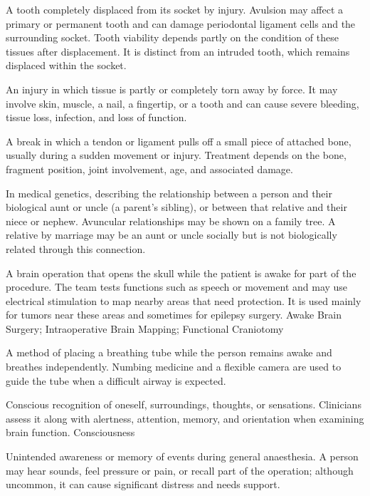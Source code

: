  A tooth completely displaced from its socket by injury. Avulsion
may affect a primary or permanent tooth and can damage periodontal ligament cells and the
surrounding socket. Tooth viability depends partly on the condition of these tissues after
displacement. It is distinct from an intruded tooth, which remains displaced within the socket.

 An injury in which tissue is partly or completely torn away by force. It may involve skin, muscle, a nail, a fingertip, or a tooth and can cause severe bleeding, tissue loss, infection, and loss of function.

 A break in which a tendon or ligament pulls off a small piece of attached bone, usually during a sudden movement or injury. Treatment depends on the bone, fragment position, joint involvement, age, and associated damage.

 In medical genetics, describing the relationship between a person and their
biological aunt or uncle (a parent's sibling), or between that relative and their niece or nephew.
Avuncular relationships may be shown on a family tree. A relative by marriage may be an aunt or
uncle socially but is not biologically related through this connection.

 A brain operation that opens the skull while the patient is awake for part
of the procedure. The team tests functions such as speech or movement and may use electrical
stimulation to map nearby areas that need protection. It is used mainly for tumors near these areas
and sometimes for epilepsy surgery.
\synonyms
Awake Brain Surgery; Intraoperative Brain Mapping; Functional Craniotomy

 A method of placing a breathing tube while the person remains awake and breathes independently. Numbing medicine and a flexible camera are used to guide the tube when a difficult airway is expected.

 Conscious recognition of oneself, surroundings, thoughts, or sensations. Clinicians assess it along with alertness, attention, memory, and orientation when examining brain function.
\synonyms
Consciousness

 Unintended awareness or memory of events during general anaesthesia. A person may hear sounds, feel pressure or pain, or recall part of the operation; although uncommon, it can cause significant distress and needs support.

